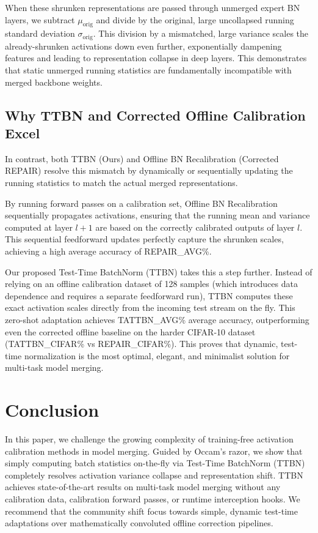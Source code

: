 \documentclass{article}
\theoremstyle{plain}
\theoremstyle{definition}
\theoremstyle{remark}
\begin{document}
When these shrunken representations are passed through unmerged expert BN layers, we subtract $\mu_{\text{orig}}$ and divide by the original, large uncollapsed running standard deviation $\sigma_{\text{orig}}$. This division by a mismatched, large variance scales the already-shrunken activations down even further, exponentially dampening features and leading to representation collapse in deep layers. This demonstrates that static unmerged running statistics are fundamentally incompatible with merged backbone weights.

\subsection{Why TTBN and Corrected Offline Calibration Excel}

In contrast, both TTBN (Ours) and Offline BN Recalibration (Corrected REPAIR) resolve this mismatch by dynamically or sequentially updating the running statistics to match the actual merged representations. 

By running forward passes on a calibration set, Offline BN Recalibration sequentially propagates activations, ensuring that the running mean and variance computed at layer $l+1$ are based on the correctly calibrated outputs of layer $l$. This sequential feedforward updates perfectly capture the shrunken scales, achieving a high average accuracy of {{REPAIR_AVG}}\%.

Our proposed Test-Time BatchNorm (TTBN) takes this a step further. Instead of relying on an offline calibration dataset of 128 samples (which introduces data dependence and requires a separate feedforward run), TTBN computes these exact activation scales directly from the incoming test stream on the fly. This zero-shot adaptation achieves {{TATTBN_AVG}}\% average accuracy, outperforming even the corrected offline baseline on the harder CIFAR-10 dataset ({{TATTBN_CIFAR}}\% vs {{REPAIR_CIFAR}}\%). This proves that dynamic, test-time normalization is the most optimal, elegant, and minimalist solution for multi-task model merging.

\section{Conclusion}
\label{conclusion}

In this paper, we challenge the growing complexity of training-free activation calibration methods in model merging. Guided by Occam's razor, we show that simply computing batch statistics on-the-fly via Test-Time BatchNorm (TTBN) completely resolves activation variance collapse and representation shift. TTBN achieves state-of-the-art results on multi-task model merging without any calibration data, calibration forward passes, or runtime interception hooks. We recommend that the community shift focus towards simple, dynamic test-time adaptations over mathematically convoluted offline correction pipelines.



\end{document}

